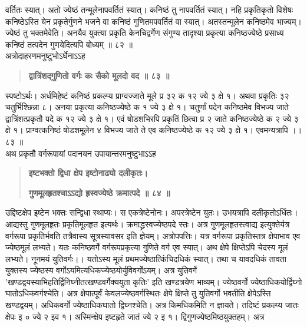 \documentclass[11pt, openany]{book}
\begin{document}
\begin{sloppypar}
\hangindent=0.2in वर्तितः स्यात्। अतो ज्येष्ठं तन्मूलेनापवर्तितं स्यात्। कनिष्ठं तु नापवर्तितं स्यात्। नहि प्रकृतिकृतो विशेषः कनिष्ठेऽस्ति येन प्रकृतेर्गुणने भजने वा कनिष्ठं गुणितमपवर्तितं वा स्यात्। अतस्तन्मूलेन कनिष्ठमेव भाज्यम्। ज्येष्ठं तु भक्तमेवेति। अनयैव युक्त्या प्रकृति केनचिद्वर्गेण संगुण्य तादृश्या प्रकृत्या कनिष्ठज्येष्ठे प्रसाध्य कनिष्ठं तत्पदेन गुणयेदित्यपि बोध्यम् ॥ ८२ ॥\\

\hangindent=0.2in \hspace{0.2in}अत्रोदाहरणमनुष्टुभोऽर्घेनाऽऽह
\textendash

\begin{quote}
\hspace{0.5in}\textbf{द्वात्रिंशद्गुणितो वर्गः कः सैको मूलदो वद ॥ ८३ ॥}
\end{quote}

\hangindent=0.2in \hspace{0.2in}स्पष्टोऽर्थः। अर्धमिहेष्टं कनिष्ठं प्रकल्प्य प्राग्वज्जाते मूले प्र ३२ क १२ ज्ये ३ क्षे १। अथवा प्रकृतिः ३२ चतुर्भिश्छिन्ना ८। अनया प्रकृत्या कनिष्ठज्येष्ठे क १ ज्ये ३ क्षे १। चतुर्णां पदेन कनिष्ठमेव विभज्य जाते द्वात्रिंशत्प्रकृतौ पदे क १२ ज्ये ३ क्षे १। एवं षोडशभिरपि प्रकृतिं छित्वा प्र २ जाते कनिष्ठज्येष्ठे क २ ज्ये ३ क्षे १। प्राग्वत्कनिष्ठं षोडशमूलेन ४ विभज्य जाते ते एव कनिष्ठज्येष्ठे क १२ ज्ये ३ क्षे १। एवमन्यत्रापि ।। ८३ ॥\\

\hangindent=0.2in \hspace{0.2in}अथ प्रकृतौ वर्गरूपायां पदानयन उपायान्तरमनुष्टुभाऽऽह\textendash

\begin{quote}
\hspace{0.5in}\textbf{इष्टभक्तो द्विधा क्षेप इष्टोनाढ्यो दलीकृतः।}

\hspace{0.5in}\textbf{गुणमूलहृतश्चाऽऽद्यो ह्रस्वज्येष्ठे क्रमात्पदे ॥ ८४ ॥}
\end{quote}

\hangindent=0.2in \hspace{0.2in}उद्दिष्टक्षेप इष्टेन भक्तः सन्द्विधा स्थाप्यः। स एकत्रेष्टेनोनः। अपरत्रेष्टेन युतः। उभयत्रापि दलीकृतोऽर्धितः। आद्यस्तु गुणमूलहृतः प्रकृतिमूलहृत इत्यर्थः। क्रमाद्ध्रस्वज्येष्ठपदे स्तः। अत्र गुणमूलहृतस्त्वाद्य इत्युक्तेर्यत्र वर्गरूपा प्रकृतिर्भवति तत्रैवास्य सूत्रस्यावसर इति ज्ञेयम्। अत्रोपपत्तिः। यत्र वर्गरूपा प्रकृतिस्तत्र क्षेपाभाव एव ज्येष्ठमूलं लभ्यते। यतः कनिष्ठवर्गे वर्गरूपप्रकृत्या गुणिते वर्ग एव स्यात्। अथ क्षेपे क्षिप्तेऽपि चेदस्य मूलं लभ्यते। नूनमयं युतिवर्गः।। यतोऽस्य मूलं प्रथमज्येष्ठात्किंचिदधिकं स्यात्। तथा च यावदधिकं तावता युक्तस्य ज्येष्ठस्य वर्गोऽयमित्यधिकज्येष्ठयोर्युविवर्गोऽयम्। अत्र युतिवर्गे 'खण्डद्वयस्याभिहतिर्द्विनिघ्नीतत्खण्डवर्गैक्ययुता कृतिः' इति खण्डत्रयेण भाव्यम्। ज्येष्ठवर्गो ज्येष्ठाधिकयोर्द्विघ्नो घातोऽधिकवर्गश्चेति। अत्र क्षेपात्पूर्वं केवलज्येष्ठवर्गस्थितः क्षेपे क्षिप्ते तु युतिवर्गो भवतीति क्षेपेऽस्ति खण्डद्वयम्। अधिकवर्गो ज्येष्ठाधिकघातो द्विघ्नश्चेति। अत्र किमधिकमिति न ज्ञायते। तदिष्टं प्रकल्प्य जातः क्षेपः इ ० ज्ये २ इव १। अस्मिन्क्षेप इष्टहृते जातं ज्ये २ इ १। द्विगुणज्येष्ठमिष्ठयुक्तहम्। अत्र
\end{sloppypar}
\thispagestyle{empty}
\newpage
\end{document}
